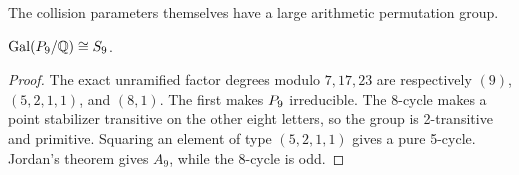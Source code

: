 The collision parameters themselves have a large arithmetic permutation
group.

\begin{proposition}\label{prop:S9}
\(\operatorname{Gal}(P_9/\mathbb{Q})\cong S_9\).
\end{proposition}

\begin{proof}
The exact unramified factor degrees modulo \(7,17,23\) are respectively
\((9)\), \((5,2,1,1)\), and \((8,1)\).  The first makes \(P_9\)
irreducible.  The 8-cycle makes a point stabilizer transitive on the other
eight letters, so the group is 2-transitive and primitive.  Squaring an
element of type \((5,2,1,1)\) gives a pure 5-cycle.  Jordan's theorem gives
\(A_9\), while the 8-cycle is odd.
\end{proof}
